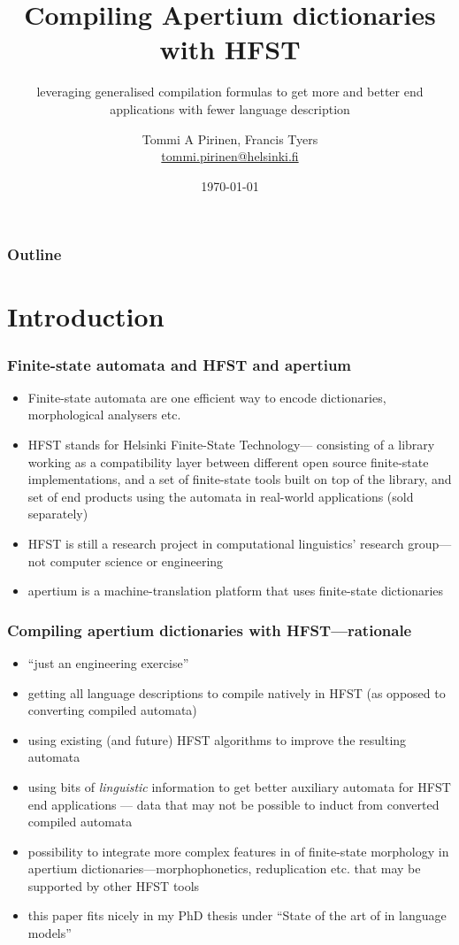 \documentclass{beamer}
\title[Compiling apertium monodix with HFST]{Compiling Apertium dictionaries with HFST}
\subtitle{leveraging generalised compilation formulas to get more and better
end applications with fewer language description}
\author[Tommi A Pirinen]{Tommi A Pirinen, Francis Tyers\\
\url{tommi.pirinen@helsinki.fi}}
\institute[Helsinki]{University of Helsinki, Universitat d'Alacant}
\date{\today}
\begin{document}
\maketitle

\begin{frame}
    \frametitle{Outline}
    \tableofcontents
\end{frame}

\section{Introduction}

\begin{frame}
    \frametitle{Finite-state automata and HFST and apertium}
    \begin{itemize}
        \item Finite-state automata are one efficient way to encode 
            dictionaries, morphological analysers etc.
        \item HFST stands for Helsinki Finite-State \alert{Technology}---
            consisting of a library working as a compatibility layer between
            different open source finite-state implementations, and a set of
            finite-state tools built on top of the library, and set of end
            products using the automata in real-world applications (sold
            separately)
        \item HFST is still a research project in computational linguistics'
            research group---not computer science or engineering
        \item apertium is a machine-translation platform that uses finite-state
            dictionaries
    \end{itemize}
\end{frame}

\begin{frame}
    \frametitle{Compiling apertium dictionaries with HFST---rationale}
    \begin{itemize}
        \item ``just an engineering exercise''
        \item getting all language descriptions to compile natively in HFST (as
            opposed to converting compiled automata)
        \item using existing (and future) HFST algorithms to improve the
            resulting automata
        \item using bits of \emph{linguistic} information to get better
            auxiliary automata for HFST end applications --- data that may not
            be possible to induct from converted compiled automata
        \item possibility to integrate more complex features in of finite-state
            morphology in apertium dictionaries---morphophonetics, reduplication
            etc. that may be supported by other HFST tools
        \item this paper fits nicely in my PhD thesis under ``State of the art of
            in language models''
    \end{itemize}
\end{frame}
\end{document}
